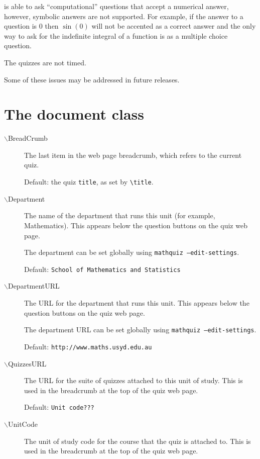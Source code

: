 \documentclass[svgnames]{article}
\begin{document}
    \MathQuiz is able to ask ``computational'' questions that accept a
    numerical answer, however, symbolic answers are not supported.
    For example, if the answer to a question is $0$ then $\sin(0)$ will
    not be accented as a correct answer and the only way to ask for the
    indefinite integral of a function is as a multiple choice question.

    The quizzes are not timed.

    Some of these issues may be addressed in future releases.

\section{The \MathQuiz document class}\label{S:documentclass}

\begin{description}
  \item[$\backslash$BreadCrumb]
     The last item in the web page breadcrumb, which refers to the current quiz.

     Default: the quiz \texttt{title}, as set by \verb!\title!.

  \item[$\backslash$Department]
    The name of the department that runs this unit (for example,
    Mathematics). This appears below the question buttons on the quiz web
    page.

    The department can be set globally using \texttt{mathquiz --edit-settings}.

    Default: \texttt{School of Mathematics and Statistics}

  \item[$\backslash$DepartmentURL]
    The URL for the department that runs this unit. This appears below
    the question buttons on the quiz web page.

    The department URL can be set globally using \texttt{mathquiz --edit-settings}.

    Default: \texttt{http://www.maths.usyd.edu.au}

  \item[$\backslash$QuizzesURL]
    The URL for the suite of quizzes attached to this unit of study. This
    is used in the breadcrumb at the top of the quiz web page.

    Default: \texttt{Unit code???}

  \item[$\backslash$UnitCode]
    The unit of study code for the course that the quiz is attached
    to. This is used in the breadcrumb at the top of the quiz web page.


\end{description}
\end{document}
